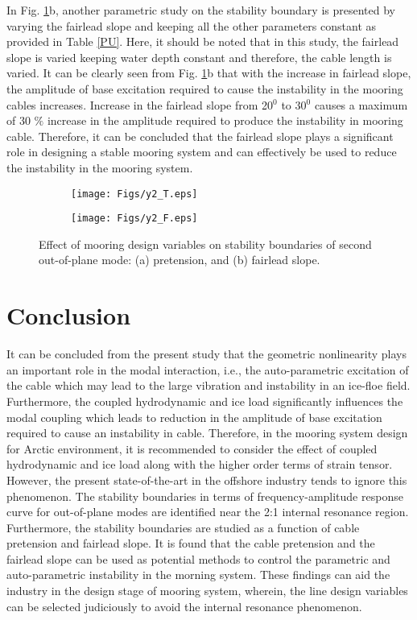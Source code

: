 \documentclass[review]{elsarticle}
\begin{document}
In Fig. \ref{ESB}b, another parametric study on the stability boundary is presented by varying the fairlead slope and keeping all the other parameters constant as provided in Table \ref{PU}. Here, it should be noted that in this study, the fairlead slope is varied keeping water depth constant and therefore, the cable length is varied. It can be clearly seen from Fig. \ref{ESB}b that with the increase in fairlead slope, the amplitude of base excitation required to cause the instability in the mooring cables increases. Increase in the fairlead slope from 20$^0$ to 30$^0$ causes a maximum of 30 $\%$ increase in the amplitude required to produce the instability in mooring cable. Therefore, it can be concluded that the fairlead slope plays a significant role in designing a stable mooring system and can effectively be used to reduce the instability in the mooring system.
\begin{figure}
	\centering
	\begin{subfigure}{.5\textwidth}
		\centering
		\texttt{[image: Figs/y2\_T.eps]}
		\caption{}
	\end{subfigure}%
	\begin{subfigure}{.5\textwidth}
		\centering
		\texttt{[image: Figs/y2\_F.eps]}
		\caption{}
	\end{subfigure}
	\caption{Effect of mooring design variables on stability boundaries of second out-of-plane mode: (a)  pretension,  and (b) fairlead slope.}
	\label{ESB}
\end{figure}
\section{Conclusion} 
It can be concluded from the present study that the geometric nonlinearity plays an important role in the modal interaction, i.e., the auto-parametric excitation of the cable which may lead to the large vibration and instability in an ice-floe field. Furthermore, the coupled hydrodynamic and ice load significantly influences the modal coupling which leads to reduction in the amplitude of base excitation required to cause an instability in cable. Therefore, in the mooring system design for Arctic environment, it is recommended to consider the effect of coupled hydrodynamic and ice load along with the higher order terms of strain tensor. However, the present state-of-the-art in the offshore industry tends to ignore this phenomenon. The stability boundaries in terms of frequency-amplitude response curve for out-of-plane modes are identified near the 2:1 internal resonance region. Furthermore, the stability boundaries are studied as a function of cable pretension and fairlead slope. It is found that the cable pretension and the fairlead slope can be used as potential methods to control the parametric and auto-parametric instability in the morning system. These findings can aid the industry in the design stage of mooring system, wherein, the line design variables can be selected judiciously to avoid the internal resonance phenomenon.
\end{document}

